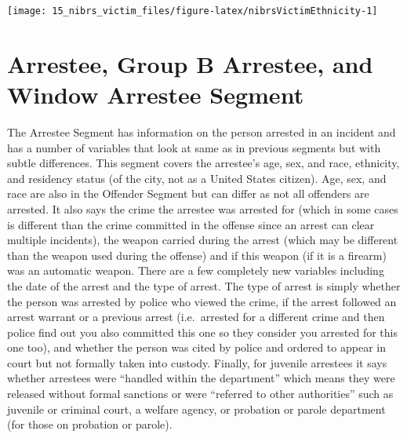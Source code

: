 \documentclass[
]{krantz}
\let\origfigure\figure
\let\endorigfigure\endfigure
\renewenvironment{figure}[1][2] {
    \expandafter\origfigure\expandafter[H]
} {
    \endorigfigure
}
\begin{document}
\begin{figure}

{\centering \texttt{[image: 15\_nibrs\_victim\_files/figure-latex/nibrsVictimEthnicity-1]} 

}

\caption{The share of victims by ethnicity, 1991-2022.}\label{fig:nibrsVictimEthnicity}
\end{figure}

\chapter{Arrestee, Group B Arrestee, and Window Arrestee
Segment}\label{arrestee}

The Arrestee Segment has information on the person arrested
in an incident and has a number of variables that look at
same as in previous segments but with subtle differences.
This segment covers the arrestee's age, sex, and race,
ethnicity, and residency status (of the city, not as a
United States citizen). Age, sex, and race are also in the
Offender Segment but can differ as not all offenders are
arrested. It also says the crime the arrestee was arrested
for (which in some cases is different than the crime
committed in the offense since an arrest can clear multiple
incidents), the weapon carried during the arrest (which may
be different than the weapon used during the offense) and if
this weapon (if it is a firearm) was an automatic weapon.
There are a few completely new variables including the date
of the arrest and the type of arrest. The type of arrest is
simply whether the person was arrested by police who viewed
the crime, if the arrest followed an arrest warrant or a
previous arrest (i.e.~arrested for a different crime and
then police find out you also committed this one so they
consider you arrested for this one too), and whether the
person was cited by police and ordered to appear in court
but not formally taken into custody. Finally, for juvenile
arrestees it says whether arrestees were ``handled within
the department'' which means they were released without
formal sanctions or were ``referred to other authorities''
such as juvenile or criminal court, a welfare agency, or
probation or parole department (for those on probation or
parole).
\end{document}
